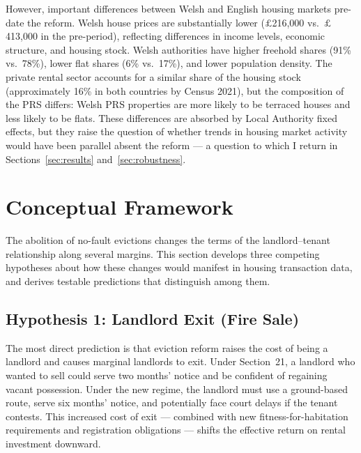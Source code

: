 \documentclass[12pt]{article}
\begin{document}
However, important differences between Welsh and English housing markets pre-date the reform. Welsh house prices are substantially lower ($\pounds$216,000 vs.\ $\pounds$413,000 in the pre-period), reflecting differences in income levels, economic structure, and housing stock. Welsh authorities have higher freehold shares (91\% vs.\ 78\%), lower flat shares (6\% vs.\ 17\%), and lower population density. The private rental sector accounts for a similar share of the housing stock (approximately 16\% in both countries by Census 2021), but the composition of the PRS differs: Welsh PRS properties are more likely to be terraced houses and less likely to be flats. These differences are absorbed by Local Authority fixed effects, but they raise the question of whether trends in housing market activity would have been parallel absent the reform --- a question to which I return in Sections~\ref{sec:results} and~\ref{sec:robustness}.


\section{Conceptual Framework}
\label{sec:framework}

The abolition of no-fault evictions changes the terms of the landlord--tenant relationship along several margins. This section develops three competing hypotheses about how these changes would manifest in housing transaction data, and derives testable predictions that distinguish among them.

\subsection{Hypothesis 1: Landlord Exit (Fire Sale)}

The most direct prediction is that eviction reform raises the cost of being a landlord and causes marginal landlords to exit. Under Section~21, a landlord who wanted to sell could serve two months' notice and be confident of regaining vacant possession. Under the new regime, the landlord must use a ground-based route, serve six months' notice, and potentially face court delays if the tenant contests. This increased cost of exit --- combined with new fitness-for-habitation requirements and registration obligations --- shifts the effective return on rental investment downward.
\end{document}
